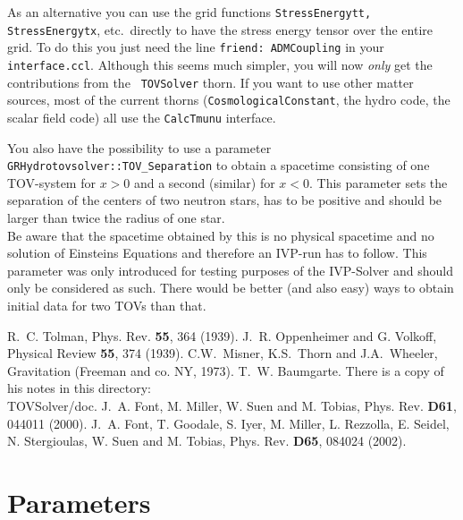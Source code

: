 As an alternative you can use the grid functions {\tt StressEnergytt,
  StressEnergytx}, etc.~directly to have the stress energy tensor over
the entire grid. To do this you just need the line {\tt friend:
  ADMCoupling} in your {\tt interface.ccl}. Although this seems much
simpler, you will now \emph{only} get the contributions from the {\tt
  TOVSolver} thorn. If you want to use other matter sources, most of
the current thorns ({\tt CosmologicalConstant}, the hydro code, the
scalar field code) all use the {\tt CalcTmunu} interface.

You also have the possibility to use a parameter
{\tt GRHydrotovsolver::TOV\_Separation} to obtain a spacetime consisting
of one TOV-system for $x>0$ and a second (similar) for $x<0$. This parameter
sets the separation of the centers of two neutron stars, has to be positive
and should be larger than twice the radius of one star.\\
Be aware that the spacetime obtained by this is no physical spacetime and
no solution of Einsteins Equations and therefore an IVP-run has to follow.
This parameter was only introduced for testing purposes of the IVP-Solver
and should only be considered as such. There would be better (and also easy)
ways to obtain initial data for two TOVs than that.





\begin{thebibliography}{10}

R.~C. Tolman, Phys. Rev. {\bf 55}, 364 (1939).
%
J.~R. Oppenheimer and G. Volkoff, Physical Review {\bf 55}, 374 (1939).
%
C.W.~Misner, K.S.~Thorn and J.A.~Wheeler, Gravitation (Freeman and co. NY, 1973).
%
T.~W. Baumgarte. There is a copy of his notes in this directory: \\
TOVSolver/doc.
%
J.~A. Font, M. Miller, W. Suen and M. Tobias, Phys. Rev. {\bf D61},
044011 (2000).
%
J.~A. Font, T. Goodale, S. Iyer, M. Miller, L. Rezzolla, E. Seidel,
N. Stergioulas, W. Suen and M. Tobias, Phys. Rev. {\bf D65},
084024 (2002).


\end{thebibliography}





\section{Parameters} 


